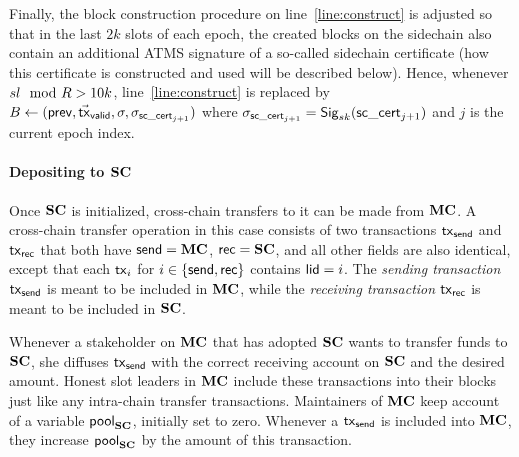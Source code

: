 Finally, the block construction procedure on line~\ref{line:construct} is
adjusted so that in the last $2k$ slots of each epoch, the created blocks on the
sidechain also
contain an additional ATMS signature of a so-called sidechain certificate (how
this certificate is constructed and used will be described below). Hence,
whenever $sl\mod R>10k$, line~\ref{line:construct} is replaced by
$
  B
  \leftarrow
  (\mathsf{prev},\vec{\mathsf{tx}}_{\mathsf{valid}},\sigma,\sigma_{\mathsf{sc\_cert}_{j+1}})
$
where
$\sigma_{\mathsf{sc\_cert}_{j+1}}=\mathsf{Sig}_{sk}(\mathsf{sc\_cert}_{j+1})$ and $j$ is the current epoch index.



\paragraph{Depositing to $\mathbf{SC}$}

Once $\mathbf{SC}$ is initialized, cross-chain transfers to it can be made from $\mathbf{MC}$.
A cross-chain transfer operation in this
case consists of two transactions $\mathsf{tx}_{\mathsf{send}}$ and $\mathsf{tx}_{\mathsf{rec}}$ that both have
$\mathsf{send}=\mathbf{MC}$, $\mathsf{rec}=\mathbf{SC}$, and all other fields are also identical, except that
each $\mathsf{tx}_i$ for $i\in\{\mathsf{send},\mathsf{rec}\}$ contains $\mathsf{lid}=i$.
The \emph{sending transaction} $\mathsf{tx}_{\mathsf{send}}$ is
meant to be included in $\mathbf{MC}$, while the \emph{receiving transaction} $\mathsf{tx}_{\mathsf{rec}}$ is meant to be included in
$\mathbf{SC}$.

    Whenever a stakeholder on $\mathbf{MC}$ that has adopted $\mathbf{SC}$  wants to transfer funds to $\mathbf{SC}$, she
    diffuses $\mathsf{tx}_{\mathsf{send}}$ with the correct receiving account on
    $\mathbf{SC}$ and the desired amount.
    Honest slot leaders in $\mathbf{MC}$
    include these transactions into their blocks just like any
    intra-chain transfer transactions.
    Maintainers of $\mathbf{MC}$ keep account of a variable $\mathsf{pool}_{\mathbf{SC}}$, initially set
    to zero. Whenever a $\mathsf{tx}_{\mathsf{send}}$ is included into $\mathbf{MC}$, they increase
    $\mathsf{pool}_{\mathbf{SC}}$ by the amount of this transaction.

